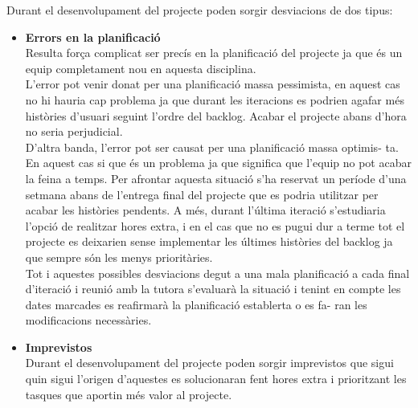 Durant el desenvolupament del projecte poden sorgir desviacions de dos tipus:
\begin{itemize}

\item{}\textbf{Errors en la planificació}\\
Resulta força complicat ser precís en la planificació del projecte ja que és un equip completament nou en aquesta disciplina.\\

L’error pot venir donat per una planificació massa pessimista, en aquest
cas no hi hauria cap problema ja que durant les iteracions es podrien agafar més històries d’usuari seguint l’ordre del backlog. Acabar el projecte abans d’hora no seria perjudicial.\\

D’altra banda, l’error pot ser causat per una planificació massa optimis-
ta. En aquest cas si que és un problema ja que significa que l’equip no
pot acabar la feina a temps. Per afrontar aquesta situació s’ha reservat un
període d’una setmana abans de l’entrega final del projecte que es podria
utilitzar per acabar les històries pendents. A més, durant l’última iteració s’estudiaria l’opció de realitzar hores extra, i en el cas que no es pugui dur a terme tot el projecte es deixarien sense implementar les últimes històries del backlog ja que sempre són les menys prioritàries.\\

Tot i aquestes possibles desviacions degut a una mala planificació a cada final d’iteració i reunió amb la tutora s’evaluarà la situació i tenint en
compte les dates marcades es reafirmarà la planificació establerta o es fa-
ran les modificacions necessàries.

\item{}\textbf{Imprevistos}\\
Durant el desenvolupament del projecte poden sorgir imprevistos que
sigui quin sigui l’origen d’aquestes es solucionaran fent hores extra i prioritzant les tasques que aportin més valor al projecte.

\end{itemize}

